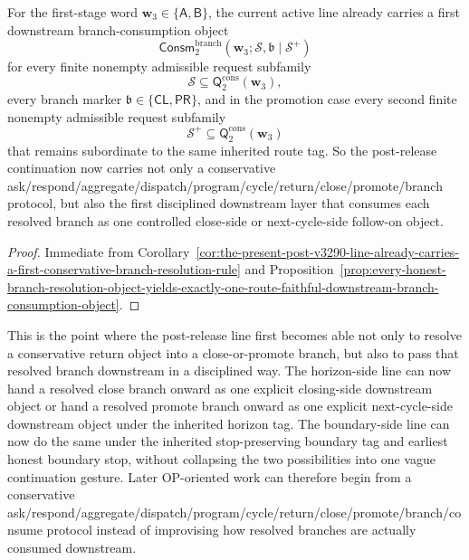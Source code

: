 \begin{corollary}
\label{cor:the-present-post-v3290-line-already-carries-a-first-downstream-branch-consumption-layer}
For the first-stage word \(\mathbf w_3\in\{\mathsf A,\mathsf B\}\), the current active line already carries a first downstream branch-consumption object
\[
  \mathsf{Consm}^{\mathrm{branch}}_{2}(\mathbf w_3;\mathcal S,\mathfrak b\mid\mathcal S^{+})
\]
for every finite nonempty admissible request subfamily
\[
  \mathcal S\subseteq \mathsf{Q}^{\mathrm{cons}}_{2}(\mathbf w_3),
\]
every branch marker \(\mathfrak b\in\{\mathsf{CL},\mathsf{PR}\}\), and in the promotion case every second finite nonempty admissible request subfamily
\[
  \mathcal S^{+}\subseteq \mathsf{Q}^{\mathrm{cons}}_{2}(\mathbf w_3)
\]
that remains subordinate to the same inherited route tag. So the post-release continuation now carries not only a conservative ask/respond/aggregate/dispatch/program/cycle/return/close/promote/branch protocol, but also the first disciplined downstream layer that consumes each resolved branch as one controlled close-side or next-cycle-side follow-on object.
\end{corollary}

\begin{proof}
Immediate from Corollary~\ref{cor:the-present-post-v3290-line-already-carries-a-first-conservative-branch-resolution-rule} and Proposition~\ref{prop:every-honest-branch-resolution-object-yields-exactly-one-route-faithful-downstream-branch-consumption-object}.
\end{proof}

\begin{remark}
\label{rem:what-the-first-downstream-branch-consumption-layer-now-buys}
This is the point where the post-release line first becomes able not only to resolve a conservative return object into a close-or-promote branch, but also to pass that resolved branch downstream in a disciplined way. The horizon-side line can now hand a resolved close branch onward as one explicit closing-side downstream object or hand a resolved promote branch onward as one explicit next-cycle-side downstream object under the inherited horizon tag. The boundary-side line can now do the same under the inherited stop-preserving boundary tag and earliest honest boundary stop, without collapsing the two possibilities into one vague continuation gesture. Later OP-oriented work can therefore begin from a conservative ask/respond/aggregate/dispatch/program/cycle/return/close/promote/branch/consume protocol instead of improvising how resolved branches are actually consumed downstream.
\end{remark}




